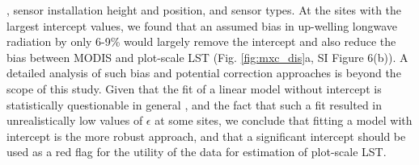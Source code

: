 \documentclass[fleqn,10pt]{wlscirep}
\providecommand{\DIFaddend}{} %
\begin{document}
{}\DIFaddend , sensor installation height and position, and sensor types\cite{marcolla2018geometry}. At the sites with the largest intercept values, we found that an assumed bias in up-welling longwave radiation by only 6-9\% would largely remove the intercept and also reduce the bias between MODIS and plot-scale LST (Fig. \ref{fig:mxc_dis}a, SI Figure 6(b)). A detailed analysis of such bias and potential correction approaches is beyond the scope of this study. Given that the fit of a linear model without intercept is statistically questionable in general \cite{eisenhauer2003regression}, and the fact that such a fit resulted in unrealistically low values of $\epsilon$ at some sites, we conclude that fitting a model with intercept is the more robust approach, and that a significant intercept should be used as a red flag for the utility of the data for estimation of plot-scale LST. 
\end{document}
